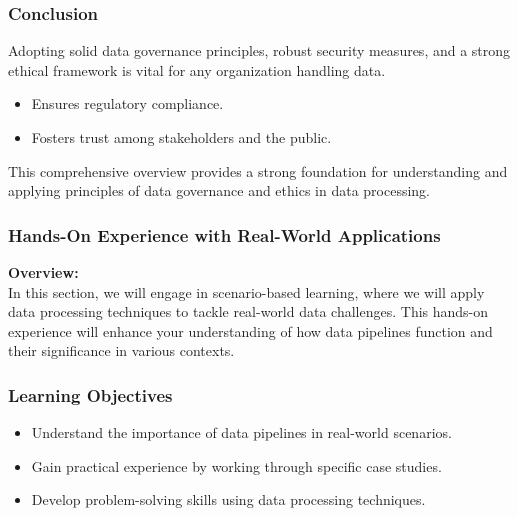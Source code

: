 \documentclass{beamer}
\begin{document}
\begin{frame}[fragile]
    \frametitle{Conclusion}
    Adopting solid data governance principles, robust security measures, and a strong ethical framework is vital for any organization handling data. 

    \begin{itemize}
        \item Ensures regulatory compliance.
        \item Fosters trust among stakeholders and the public.
    \end{itemize}

    This comprehensive overview provides a strong foundation for understanding and applying principles of data governance and ethics in data processing.
\end{frame}

\begin{frame}
    \frametitle{Hands-On Experience with Real-World Applications}
    \textbf{Overview:} \\
    In this section, we will engage in scenario-based learning, where we will apply data processing techniques to tackle real-world data challenges. This hands-on experience will enhance your understanding of how data pipelines function and their significance in various contexts.
\end{frame}

\begin{frame}
    \frametitle{Learning Objectives}
    \begin{itemize}
        \item Understand the importance of data pipelines in real-world scenarios.
        \item Gain practical experience by working through specific case studies.
        \item Develop problem-solving skills using data processing techniques.
    \end{itemize}
\end{frame}
\end{document}
